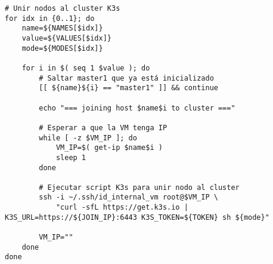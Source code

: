 \begin{verbatim}
# Unir nodos al cluster K3s
for idx in {0..1}; do
    name=${NAMES[$idx]}
    value=${VALUES[$idx]}
    mode=${MODES[$idx]}

    for i in $( seq 1 $value ); do
        # Saltar master1 que ya está inicializado
        [[ ${name}${i} == "master1" ]] && continue

        echo "=== joining host $name$i to cluster ==="

        # Esperar a que la VM tenga IP
        while [ -z $VM_IP ]; do 
            VM_IP=$( get-ip $name$i )
            sleep 1
        done

        # Ejecutar script K3s para unir nodo al cluster
        ssh -i ~/.ssh/id_internal_vm root@$VM_IP \
            "curl -sfL https://get.k3s.io | K3S_URL=https://${JOIN_IP}:6443 K3S_TOKEN=${TOKEN} sh ${mode}"

        VM_IP=""
    done
done
\end{verbatim}